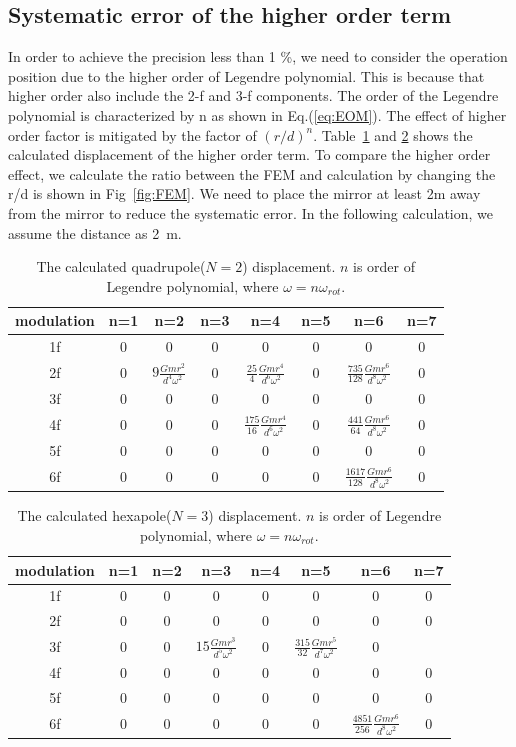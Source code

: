 \documentclass[A4]{spie}  %
\begin{document}
\subsection{Systematic error of the higher order term}
In order to achieve the precision less than 1 \%, we need to consider the operation position due to the higher order of Legendre polynomial. This is because that higher order also include the 2-f and 3-f components. The order of the Legendre polynomial is characterized by n as shown in Eq.(\ref{eq:EOM}). The effect of higher order factor is mitigated by the factor of $(r/d)^n$. Table~\ref{tab:N2} and \ref{tab:N3} shows the calculated displacement of the higher order term. To compare the higher order effect, we calculate the ratio between the FEM and calculation by changing the r/d is shown in Fig~\ref{fig:FEM}. We need to place the mirror at least 2m away from the mirror to reduce the systematic error. In the following calculation, we assume the distance as 2~m. 

\begin{table}
\begin{center}
\caption{The calculated quadrupole($N=2$) displacement. $n$ is order of Legendre polynomial, where $\omega=n\omega_{rot}$. \label{tab:N2}}
\footnotesize
\begin{tabular}{cccccccc}
\hline
modulation& n=1 & n=2& n=3 &n=4&n=5&n=6&n=7 \\
\hline
1f&0&0&0&0&0&0&0 \\
2f&0&$9 \frac{Gmr^2}{d^4\omega^2}$&0&$\frac{25}{4} \frac{Gmr^4}{d^6\omega^2}$&0&$\frac{735}{128} \frac{Gmr^6}{d^8\omega^2}$&0  \\
3f&0&0&0&0&0&0&0\\
4f&0&0&0&$\frac{175}{16} \frac{Gmr^4}{d^6\omega^2}$&0& $\frac{441}{64} \frac{Gmr^6}{d^8\omega^2}$&0 \\
5f&0&0&0&0&0&0&0 \\
6f&0&0&0&0&0&$\frac{1617}{128} \frac{Gmr^6}{d^8\omega^2}$&0  \\
\hline
\end{tabular}
\end{center}
\end{table}

\begin{table}
\begin{center}
\caption{The calculated hexapole($N=3$) displacement. $n$ is order of Legendre polynomial, where $\omega=n\omega_{rot}$.  \label{tab:N3}}
\footnotesize
\begin{tabular}{cccccccc}
\hline
modulation& n=1 & n=2& n=3 &n=4&n=5&n=6&n=7 \\
\hline
1f&0&0&0&0&0&0&0 \\
2f&0&0&0&0&0&0&0  \\
3f&0&0&$15\frac{Gmr^3}{d^5\omega^2}$&0&$\frac{315}{32}\frac{Gmr^5}{d^7\omega^2}$&0&\\
4f&0&0&0&0&0&0&0 \\
5f&0&0&0&0&0&0&0 \\
6f&0&0&0&0&0&$\frac{4851}{256} \frac{Gmr^6}{d^8\omega^2}$&0  \\
\hline
\end{tabular}
\end{center}
\end{table}
\end{document}
